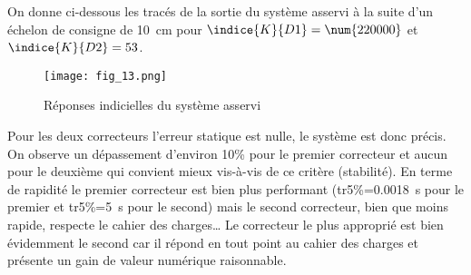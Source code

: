 \ifprof
\else
 On donne ci-dessous les tracés de la sortie du système asservi à la suite d’un échelon de consigne de 
\SI{10}{cm} pour $\indice{K}{D1} = \num{220000}$ et $\indice{K}{D2} = 53$.


\begin{figure}[!h]
\centering
\texttt{[image: fig\_13.png]}
\caption{Réponses indicielles du système asservi \label{fig_13}}
\end{figure}
\fi

\ifprof
\begin{corrige}%
Pour les deux correcteurs l’erreur statique est nulle, le système est donc précis.
On observe un dépassement d’environ 10\% pour le premier correcteur et aucun pour le deuxième qui convient mieux vis-à-vis de ce critère (stabilité).
En terme de rapidité le premier correcteur est bien plus performant (tr5\%=\SI{0,0018}{s} pour le premier et tr5\%=\SI{5}{s} pour le second) mais le second correcteur, bien que moins rapide, respecte le cahier des charges…
Le correcteur le plus approprié est bien évidemment le second car il répond en tout point au cahier des charges et présente un gain de valeur numérique raisonnable.

\end{corrige}
\else
\fi
